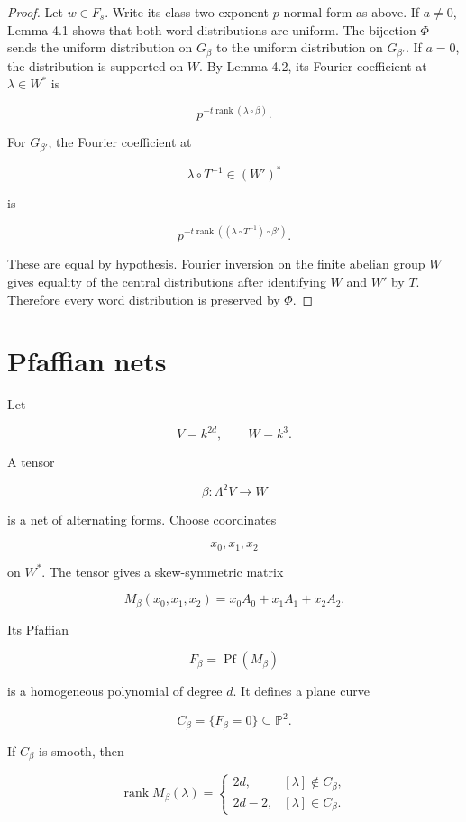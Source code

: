 \documentclass[11pt]{article}
\begin{document}
\begin{proof}
Let $w\in F_s$. Write its class-two exponent-$p$ normal form as above. If $a\neq0$, Lemma 4.1 shows that both word distributions are uniform. The bijection $\Phi$ sends the uniform distribution on $G_\beta$ to the uniform distribution on $G_{\beta'}$. If $a=0$, the distribution is supported on $W$. By Lemma 4.2, its Fourier coefficient at $\lambda\in W^*$ is

\[
p^{-t\operatorname{rank}(\lambda\circ\beta)}.
\]

For $G_{\beta'}$, the Fourier coefficient at

\[
\lambda\circ T^{-1}\in (W')^*
\]

is

\[
p^{-t\operatorname{rank}((\lambda\circ T^{-1})\circ\beta')}.
\]

These are equal by hypothesis. Fourier inversion on the finite abelian group $W$ gives equality of the central distributions after identifying $W$ and $W'$ by $T$. Therefore every word distribution is preserved by $\Phi$.

\end{proof}

\section{Pfaffian nets}

Let

\[
V=k^{2d},\qquad W=k^3.
\]

A tensor

\[
\beta:\Lambda^2V\to W
\]

is a net of alternating forms. Choose coordinates

\[
x_0,x_1,x_2
\]

on $W^*$. The tensor gives a skew-symmetric matrix

\[
M_\beta(x_0,x_1,x_2)
=x_0A_0+x_1A_1+x_2A_2.
\]

Its Pfaffian

\[
F_\beta=\operatorname{Pf}(M_\beta)
\]

is a homogeneous polynomial of degree $d$. It defines a plane curve

\[
C_\beta=\{F_\beta=0\}\subseteq\mathbb P^2.
\]

If $C_\beta$ is smooth, then

\[
\operatorname{rank}M_\beta(\lambda)
=\begin{cases}
2d, & [\lambda]\notin C_\beta,\\
2d-2, & [\lambda]\in C_\beta.
\end{cases}
\]
\end{document}
